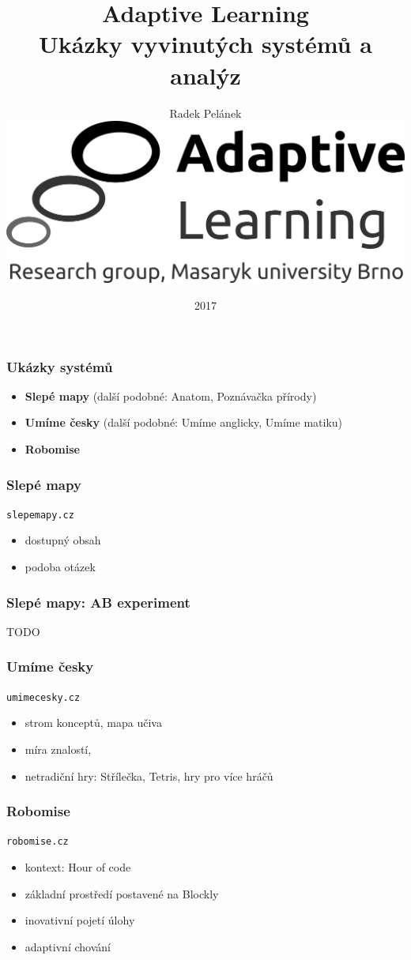 \documentclass[bigger]{beamer}
\title{Adaptive Learning\\Ukázky vyvinutých systémů a analýz}
\author{Radek Pelánek\\[10mm]
  \includegraphics[width=.2\linewidth]{al-logo-researchgroup}}
\date{2017}
\begin{document}
\frame{\titlepage}

\begin{frame}
  \frametitle{Ukázky systémů}

  \begin{itemize}
  \item \textbf{Slepé mapy} (další podobné: Anatom, Poznávačka přírody)
  \item \textbf{Umíme česky} (další podobné: Umíme anglicky, Umíme matiku)
  \item \textbf{Robomise}
  \end{itemize}
\end{frame}

\begin{frame}
  \frametitle{Slepé mapy}

  \texttt{slepemapy.cz}

  \bigskip

  \begin{itemize}
  \item dostupný obsah
  \item podoba otázek
  \end{itemize}
\end{frame}

\begin{frame}
  \frametitle{Slepé mapy: AB experiment}

  TODO
\end{frame}

\begin{frame}
  \frametitle{Umíme česky}

  \texttt{umimecesky.cz}

  \bigskip

  \begin{itemize}
  \item strom konceptů, mapa učiva
  \item míra znalostí, 
  \item netradiční hry: Střílečka, Tetris, hry pro více hráčů
  \end{itemize}
\end{frame}

\begin{frame}
  \frametitle{Robomise}

  \texttt{robomise.cz}

  \bigskip

  \begin{itemize}
  \item kontext: Hour of code
  \item základní prostředí postavené na Blockly
  \item inovativní pojetí úlohy
  \item adaptivní chování
  \end{itemize}
\end{frame}
\end{document}
